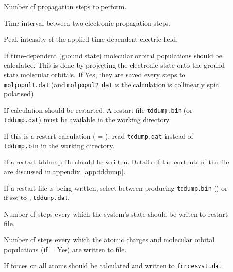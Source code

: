 \begin{description}
\item[] Number of propagation steps to perform.

\item[] Time interval between two
  electronic propagation steps.

\item[]
  Peak intensity of the applied time-dependent electric field.

\item[] If time-dependent (ground state) molecular
  orbital populations should be calculated. This is done by projecting
  the electronic state onto the ground state molecular orbitals. If
  Yes, they are saved every  steps to
  \verb|molpopul1.dat| (and \verb|molpopul2.dat| is the calculation is
  collinearly spin polarised).

\item[] If calculation should be restarted. A restart file
  \verb|tddump.bin| (or \verb|tddump.dat|) must be available in the working
  directory.

\item[] If this is a restart calculation ( =
  ), read \verb|tddump.dat| instead of \verb|tddump.bin| in the working
  directory.

\item[] If a restart tddump file should be written. Details of
  the contents of the file are discussed in appendix~\ref{app:tddump}.

\item[] If a restart file is being written, select between
  producing \verb|tddump.bin| () or if set to ,
  \verb|tddump.dat|.

\item[] Number of steps every which the system's
  state should be writen to restart file.

\item[] Number of steps every which the atomic
  charges and molecular orbital populations (if  =
  Yes) are written to file.

\item[] If forces on all atoms should be calculated and
  written to \verb|forcesvst.dat|.


\end{description}
